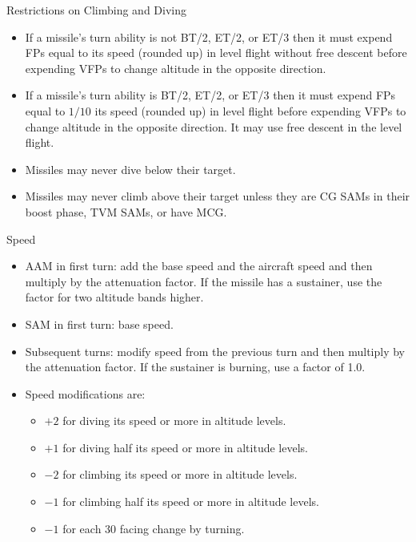\begin{onecolumntable}
{\begin{center}Restrictions on Climbing and Diving\end{center}

\begin{itemize}
    \item 
    If a missile's turn ability is not BT/2, ET/2, or ET/3 then it must expend FPs equal to {\onethird} its speed (rounded up) in level flight without free descent before expending VFPs to change altitude in the opposite direction. 
    \item 
    If a missile's turn ability is BT/2, ET/2, or ET/3 then it must expend FPs equal to $1/10$ its speed (rounded up) in level flight before expending VFPs to change altitude in the opposite direction. It may use free descent in the level flight.
    \item Missiles may never dive below their target.
    \item Missiles may never climb above their target unless they are CG SAMs in their boost phase, TVM SAMs, or have MCG.
\end{itemize}

\begin{center}Speed\end{center}

\begin{itemize}
    \item AAM in first turn: add the base speed and the aircraft speed and then multiply by the attenuation factor. If the missile has a sustainer, use the factor for two altitude bands higher.
    \item SAM in first turn: base speed.
    \item Subsequent turns: modify speed from the previous turn and then multiply by the attenuation factor. If the sustainer is burning, use a factor of 1.0.
    \item Speed modifications are:
    \begin{itemize}
        \item $+2$ for diving its speed or more in altitude levels.
        \item $+1$ for diving half its speed or more in altitude levels.
        \item $-2$ for climbing its speed or more in altitude levels.
        \item $-1$ for climbing half its speed or more in altitude levels.
        \item $-1$ for each 30{\deg} facing change by turning.
    \end{itemize}
\end{itemize}

}
\end{onecolumntable}
